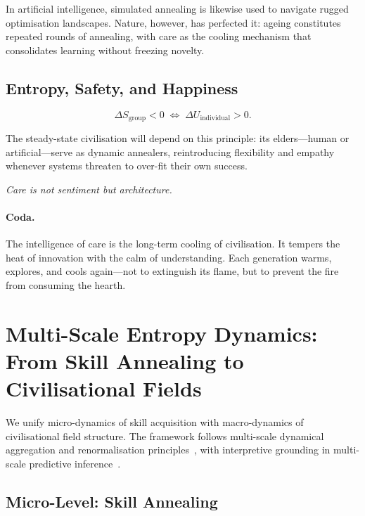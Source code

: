 \documentclass[12pt,a4paper]{article}
\theoremstyle{definition}
\begin{document}
In artificial intelligence, simulated annealing is likewise used to navigate
rugged optimisation landscapes.  Nature, however, has perfected it: ageing
constitutes repeated rounds of annealing, with care as the cooling mechanism
that consolidates learning without freezing novelty.

\subsection{Entropy, Safety, and Happiness}

\begin{equation}
  \Delta S_{\mathrm{group}} < 0
  \;\Longleftrightarrow\;
  \Delta U_{\mathrm{individual}} > 0.
\end{equation}

The steady-state civilisation will depend on this principle: its elders---human
or artificial---serve as dynamic annealers, reintroducing flexibility and
empathy whenever systems threaten to over-fit their own success.

\medskip
\begin{center}
  \itshape Care is not sentiment but architecture.
\end{center}

\paragraph{Coda.}
The intelligence of care is the long-term cooling of civilisation.  It tempers
the heat of innovation with the calm of understanding.  Each generation warms,
explores, and cools again---not to extinguish its flame, but to prevent the
fire from consuming the hearth.


\section{Multi-Scale Entropy Dynamics: From Skill Annealing to Civilisational Fields}
\label{sec:multiscale}

We unify micro-dynamics of skill acquisition with macro-dynamics
of civilisational field structure.
The framework follows multi-scale dynamical aggregation and
renormalisation principles~\citep{wilson1971,stanley1971},
with interpretive grounding in multi-scale predictive inference~\citep{friston2023}.

\subsection{Micro-Level: Skill Annealing}
\end{document}

